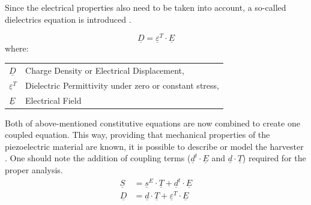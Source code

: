 \documentclass[12pt,a4paper]{article}
\makeatletter
\newenvironment{conditions}
  {\par\vspace{\abovedisplayskip}\noindent\begin{tabular}{>{$}l<{$} @{${}-{}$} l}}
  {\end{tabular}\par\vspace{\belowdisplayskip}}
\makeatother
\begin{document}
Since the electrical properties also need to be taken into account, a so-called dielectrics equation is introduced  \cite{cmos}.

\begin{equation}
	\underline{D} = \underline{\varepsilon}^T \cdot \underline{E}
	\label{eqn:dielectrics}
\end{equation}
where:
\begin{conditions}
	\underline{D}     &  Charge Density or Electrical Displacement, \\
 	\underline{\varepsilon}^T    &  Dielectric Permittivity under zero or constant stress, \\   
 	\underline{E} &  Electrical Field	
\end{conditions}
Both of above-mentioned constitutive equations are now combined to create one coupled equation. This way, providing that mechanical properties of the piezoelectric material are known, it is possible to describe or model the harvester \cite{piezomath}. One should note the addition of coupling terms ($\underline{d}^t \cdot \underline{E}$ and $\underline{d} \cdot \underline{T}$) required for the proper analysis.
\begin{equation}
\label{eq:coupled}
\begin{aligned}
	\underline{S} &= \underline{s}^E \cdot \underline{T} + \underline{d}^t \cdot \underline{E}\\
	\underline{D} &= \underline{d} \cdot \underline{T} + \underline{\varepsilon}^T \cdot \underline{E}
\end{aligned}
\end{equation}
\end{document}
